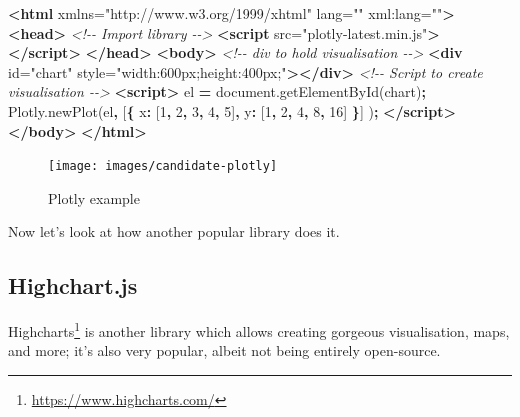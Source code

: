 \documentclass[
  10pt,
]{krantz}
\makeatletter
\newenvironment{Shaded}{\begin{snugshade}}{\end{snugshade}}
\newcommand{\AttributeTok}[1]{\textcolor[rgb]{0.61,0.61,0.61}{#1}}
\newcommand{\CommentTok}[1]{\textcolor[rgb]{0.37,0.37,0.37}{\textit{#1}}}
\newcommand{\DataTypeTok}[1]{\textcolor[rgb]{0.27,0.27,0.27}{#1}}
\newcommand{\DecValTok}[1]{\textcolor[rgb]{0.06,0.06,0.06}{#1}}
\newcommand{\KeywordTok}[1]{\textcolor[rgb]{0.27,0.27,0.27}{\textbf{#1}}}
\newcommand{\NormalTok}[1]{#1}
\newcommand{\OperatorTok}[1]{\textcolor[rgb]{0.43,0.43,0.43}{\textbf{#1}}}
\newcommand{\OtherTok}[1]{\textcolor[rgb]{0.37,0.37,0.37}{#1}}
\newcommand{\StringTok}[1]{\textcolor[rgb]{0.5,0.5,0.5}{#1}}
\newcommand{\VariableTok}[1]{\textcolor[rgb]{0,0,0}{#1}}
\renewcommand{\href}[2]{#2\footnote{\url{#1}}}
\newenvironment{kframe}{%
\medskip{}
\setlength{\fboxsep}{.8em}
 \def\at@end@of@kframe{}%
 \ifinner\ifhmode%
  \def\at@end@of@kframe{\end{minipage}}%
  \begin{minipage}{\columnwidth}%
 \fi\fi%
 \def\FrameCommand##1{\hskip\@totalleftmargin \hskip-\fboxsep
 \colorbox{shadecolor}{##1}\hskip-\fboxsep
     \hskip-\linewidth \hskip-\@totalleftmargin \hskip\columnwidth}%
 \MakeFramed {\advance\hsize-\width
   \@totalleftmargin\z@ \linewidth\hsize
   \@setminipage}}%
 {\par\unskip\endMakeFramed%
 \at@end@of@kframe}
\renewenvironment{Shaded}{\begin{kframe}}{\end{kframe}}
\makeatother
\begin{document}
\begin{Shaded}
\begin{Highlighting}[]
\KeywordTok{<html}\OtherTok{ xmlns=}\StringTok{"http://www.w3.org/1999/xhtml"}\OtherTok{ lang=}\StringTok{""}\OtherTok{ xml:lang=}\StringTok{""}\KeywordTok{>}
\KeywordTok{<head>}
  \CommentTok{<!{-}{-} Import library {-}{-}>}
  \KeywordTok{<script}\OtherTok{ src=}\StringTok{"plotly{-}latest.min.js"}\KeywordTok{></script>}
\KeywordTok{</head>}
\KeywordTok{<body>}
  \CommentTok{<!{-}{-} div to hold visualisation {-}{-}>}
  \KeywordTok{<div}\OtherTok{ id=}\StringTok{"chart"}\OtherTok{ style=}\StringTok{"width:600px;height:400px;"}\KeywordTok{></div>}
  \CommentTok{<!{-}{-} Script to create visualisation {-}{-}>}
  \KeywordTok{<script>}
\NormalTok{    el }\OperatorTok{=} \VariableTok{document}\NormalTok{.}\AttributeTok{getElementById}\NormalTok{(}\StringTok{\textquotesingle{}chart\textquotesingle{}}\NormalTok{)}\OperatorTok{;}
    \VariableTok{Plotly}\NormalTok{.}\AttributeTok{newPlot}\NormalTok{(el}\OperatorTok{,}\NormalTok{ [}\OperatorTok{\{}
      \DataTypeTok{x}\OperatorTok{:}\NormalTok{ [}\DecValTok{1}\OperatorTok{,} \DecValTok{2}\OperatorTok{,} \DecValTok{3}\OperatorTok{,} \DecValTok{4}\OperatorTok{,} \DecValTok{5}\NormalTok{]}\OperatorTok{,}
      \DataTypeTok{y}\OperatorTok{:}\NormalTok{ [}\DecValTok{1}\OperatorTok{,} \DecValTok{2}\OperatorTok{,} \DecValTok{4}\OperatorTok{,} \DecValTok{8}\OperatorTok{,} \DecValTok{16}\NormalTok{] }\OperatorTok{\}}\NormalTok{]}
\NormalTok{    )}\OperatorTok{;}
  \KeywordTok{</script>}
\KeywordTok{</body>}
\KeywordTok{</html>}
\end{Highlighting}
\end{Shaded}

\begin{figure}[H]

{\centering \texttt{[image: images/candidate-plotly]} 

}

\caption{Plotly example}\label{fig:candidate-plotly}
\end{figure}

Now let's look at how another popular library does it.

\hypertarget{widgets-basics-candidates-highcharts}{%
\subsection{Highchart.js}\label{widgets-basics-candidates-highcharts}}

\href{https://www.highcharts.com/}{Highcharts} is another library which allows creating gorgeous visualisation, maps, and more; it's also very popular, albeit not being entirely open-source.
\end{document}
